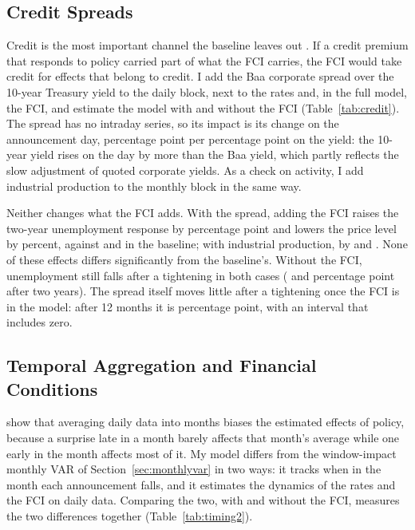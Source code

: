 \documentclass[11pt]{article}
\begin{document}
\subsection{Credit Spreads}\label{sec:credit}
Credit is the most important channel the baseline leaves out \citep{gertler2015,gilchrist2012,caldara2019}. If a credit premium that responds to policy carried part of what the FCI carries, the FCI would take credit for effects that belong to credit. I add the Baa corporate spread over the 10-year Treasury yield to the daily block, next to the rates and, in the full model, the FCI, and estimate the model with and without the FCI (Table~\ref{tab:credit}). The spread has no intraday series, so its impact is its change on the announcement day,  percentage point per percentage point on the yield: the 10-year yield rises on the day by more than the Baa yield, which partly reflects the slow adjustment of quoted corporate yields. As a check on activity, I add industrial production to the monthly block in the same way.



Neither changes what the FCI adds. With the spread, adding the FCI raises the two-year unemployment response by  percentage point and lowers the price level by  percent, against  and  in the baseline; with industrial production, by  and . None of these effects differs significantly from the baseline's. Without the FCI, unemployment still falls after a tightening in both cases ( and  percentage point after two years). The spread itself moves little after a tightening once the FCI is in the model: after 12 months it is  percentage point, with an interval that includes zero.

\subsection{Temporal Aggregation and Financial Conditions}\label{sec:timingtest}
\citet{jacobson2026} show that averaging daily data into months biases the estimated effects of policy, because a surprise late in a month barely affects that month's average while one early in the month affects most of it. My model differs from the window-impact monthly VAR of Section~\ref{sec:monthlyvar} in two ways: it tracks when in the month each announcement falls, and it estimates the dynamics of the rates and the FCI on daily data. Comparing the two, with and without the FCI, measures the two differences together (Table~\ref{tab:timing2}).
\end{document}
